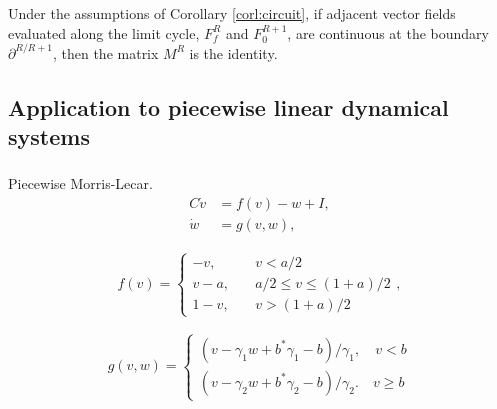 \documentclass{beamer}
\begin{document}
\begin{frame}
 \frametitle{\insertsection}
\framesubtitle{\insertsubsection}
 \begin{corollary}\label{corl:c0-vector-fields}
 Under the assumptions of Corollary \ref{corl:circuit}, if adjacent vector fields evaluated along the limit cycle, $F_f^R$ and $F_0^{R+1}$, are continuous at the boundary $\partial^{R/R+1}$, then the matrix $M^R$ is the identity.
\end{corollary}
\end{frame}


\subsection{Application to piecewise linear dynamical systems}

\begin{frame}
\frametitle{\insertsection}
\framesubtitle{\insertsubsection}
Piecewise Morris-Lecar.
\begin{equation}
 \begin{split}
  C \dot{v} &= f(v) - w + I,\\
  \dot{w} &= g(v,w),
 \end{split}
\label{eq:coombes-eqs}\end{equation}

 \begin{equation}
 \begin{split}
  f(v) = \left \{ \begin{array}{ll} -v,& \quad v< a/2  \\ v - a, & \quad a/2 \leq v \leq (1+a)/2 \\ 1- v, & \quad v >(1+a)/2 \end{array} \right . ,
 \end{split}
\end{equation}

 \begin{displaymath}
   g(v,w) = \left\{
     \begin{array}{lr}
       (v-\gamma_1w+b^*\gamma_1-b)/\gamma_1, \quad v < b\\
       (v-\gamma_2w+b^* \gamma_2-b)/\gamma_2. \quad v \geq b
     \end{array}
   \right.
\end{displaymath}
\end{frame}
\end{document}
